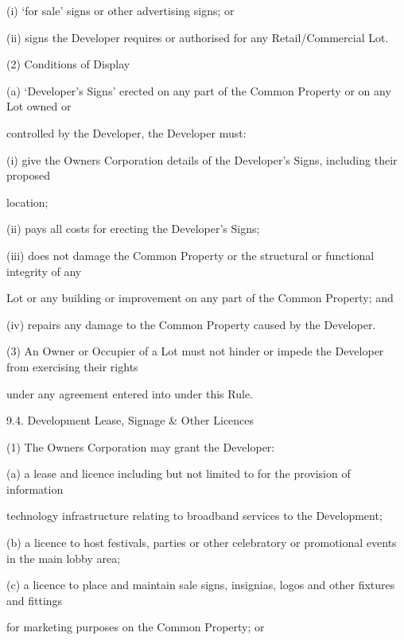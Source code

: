 \documentclass{article}
\begin{document}
{\fontsize{9.962}{1}(i) ‘for sale’ signs or other advertising signs; or }

{\fontsize{9.962}{1}(ii) signs the Developer requires or authorised for any Retail/Commercial Lot. }

{\fontsize{9.962}{1}(2) Conditions of Display }

{\fontsize{9.962}{1}(a) ‘Developer’s Signs’ erected on any part of the Common Property or on any Lot owned or }

{\fontsize{10.02}{1}controlled by the Developer, the Developer must: }

{\fontsize{9.962}{1}(i) give the Owners Corporation details of the Developer’s Signs, including their proposed }

{\fontsize{10.02}{1}location; }

{\fontsize{9.962}{1}(ii) pays all costs for erecting the Developer’s Signs; }

{\fontsize{9.962}{1}(iii) does not damage the Common Property or the structural or functional integrity of any }

{\fontsize{10.02}{1}Lot or any building or improvement on any part of the Common Property; and }

{\fontsize{9.962}{1}(iv) repairs any damage to the Common Property caused by the Developer. }

{\fontsize{9.962}{1}(3) An Owner or Occupier of a Lot must not hinder or impede the Developer from exercising their rights }

{\fontsize{10.02}{1}under any agreement entered into under this Rule. }

{\fontsize{9.99}{1}9.4. Development Lease, Signage \& Other Licences }

{\fontsize{9.962}{1}(1) The Owners Corporation may grant the Developer: }

{\fontsize{9.962}{1}(a) a lease and licence including but not limited to for the provision of information }

{\fontsize{10.02}{1}technology infrastructure relating to broadband services to the Development; }

{\fontsize{9.962}{1}(b) a licence to host festivals, parties or other celebratory or promotional events in the main lobby area; }

{\fontsize{9.962}{1}(c) a licence to place and maintain sale signs, insignias, logos and other fixtures and fittings }

{\fontsize{10.02}{1}for marketing purposes on the Common Property; or }
\end{document}
